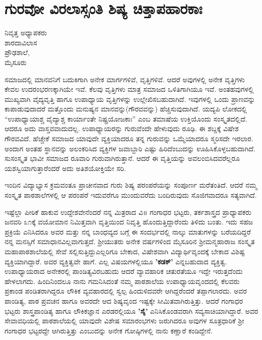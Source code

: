 \chapter{ಗುರವೋ ವಿರಲಾಸ್ಸಂತಿ  ಶಿಷ್ಯ ಚಿತ್ತಾಪಹಾರಕಾಃ}

\begin{center}
\smallskip

ನಿವೃತ್ತ ಅಧ್ಯಾಪಕರು\\
ಶಾರದಾವಿಲಾಸ\\ 
ಪ್ರೌಢಶಾಲೆ,\\ 
ಮೈಸೂರು
\addrule
\end{center}

ಸಮಾಜದಲ್ಲಿ ಮಾನವನಿಗೆ ಬದುಕಿಗಾಗಿ ಅನೇಕ ಮಾರ್ಗಗಳಿವೆ, ವೃತ್ತಿಗಳಿವೆ. ಆದರೆ ಅವುಗಳಲ್ಲಿ ಅನೇಕ ವೃತ್ತಿಗಳು ಕೇವಲ ಉದರಂಭರಣಕ್ಕಾಗಿಯೇ ಇವೆ. ಕೆಲವು ವೃತ್ತಿಗಳು ಮಾತ್ರ ಸಮಾಜದ ಒಳಿತಿಗಾಗಿಯೂ ಇವೆ. ಅಂತಹವುಗಳಲ್ಲಿ ಮುಖ್ಯವಾಗಿ ವೈದ್ಯವೃತ್ತಿ ಹಾಗೂ ಉಪಾಧ್ಯಾಯ ವೃತ್ತಿಗಳನ್ನು ಉಲ್ಲೇಖಿಸಬಹುದಾಗಿದೆ. ಇವುಗಳಲ್ಲಿ ಒಂದು ಪ್ರಾಣವನ್ನು ಕಾಪಾಡುವುದಾದರೆ ಮತ್ತೊಂದು ಮನುಷ್ಯನ ಮಾನವನ್ನು(ಗೌರವವನ್ನು) ಹೆಚ್ಚಿಸುವುದಾಗಿದೆ. ಯದ್ಯಪಿ ಲೋಕದಲ್ಲಿ “ಉಪಾಧ್ಯಾಯಾಶ್ಚ ವೈದ್ಯಾಶ್ಚ ಕಾರ್ಯಾಂತೇ ನಿಷ್ಪ್ರಯೋಜಕಾಃ” ಎಂಬ ತಮಾಷೆಯ ಉಕ್ತಿಯೊಂದು ಸಂಸ್ಕೃತದಲ್ಲಿದೆ. ಆದರೂ ಅದು ವಾಸ್ತವವಾದುದಲ್ಲ. ಉಪಾಧ್ಯಾಯರನ್ನು ಗುರುವೆಂದೇ ಹೇಳುವುದು ರೂಢಿ. ಈ ಶಬ್ದಕ್ಕೆ ವಿಷೇಶ ಗೌರವವಿದೆ. ಹೆಚ್ಚೇಕೆ ಸಮಾಜದ ಯಾವುದೇ ವ್ಯಕ್ತಿಯಾದರೂ ತನ್ನ ಗುರುವನ್ನು ಒಮ್ಮೆಯಾದರೂ ಸ್ಮರಿಸದೇ ಇರಲಾರ. ಅಂದಾಗ ಅಂತಹ ಸ್ಥಾನವನ್ನು ಅಲಂಕರಿಸಿದ ವ್ಯಕ್ತಿಗಳ ಜವಾಬ್ದಾರಿ ಎಷ್ಟು ಹಿರಿದೆಂಬುದನ್ನು ಊಹಿಸಿಕೊಳ್ಳಬಹುದಾಗಿದೆ. ಸುಸಂಸ್ಕೃತ ಭಾವೀ ಸಮಾಜದ ರೂವಾರಿ ಗುರುವಾಗಿರುತ್ತಾನೆ. ಆದರೆ ಈ ವೃತ್ತಿಯನ್ನು ಅವಲಂಬಿಸಿದವರೆಲ್ಲರೂ ಯಶಸ್ವಿಯಾಗುತ್ತಾರೆಂದರೆ ಅದು ಅತಿಶಯೋಕ್ತಿಯೇ ಸರಿ.

ಇಂದಿನ ವಿದ್ಯಾಭ್ಯಾಸ ಕ್ರಮವಂತೂ ಪ್ರಾಚೀನವಾದ ಗುರು ಶಿಷ್ಯ ಪರಂಪರೆಯನ್ನು ಸಂಪೂರ್ಣ ಮರೆತಂತಿದೆ. ಆದರೆ ನಮ್ಮ ಸಂಸ್ಕೃತ ಪಾಠಶಾಲೆಗಳಲ್ಲಿ ಆ ಪರಂಪರೆ ಇದುವರೆಗೂ ಮುಂದುವರೆದು ಬಂದಿರುವುದು ಸೊಜಿಗವಾದರೂ ಸತ್ಯವಾಗಿದೆ.

ಇಷ್ಟೆಲ್ಲಾ ಪೀಠಿಕೆ ಹಾಕುವ ಉದ್ದೇಶವೇನೆಂದರೆ ನನ್ನ ಮಿತ್ರರಾದ ವಿ॥ ಗಂಗಾಧರ ಭಟ್ಟರು, ತರ್ಕಶಾಸ್ತ್ರದ ಪ್ರಾಧ್ಯಾಪಕರು ಜನವರಿ ೩೧ಕ್ಕೆ ವಯೋಮಾನ ನಿಮಿತ್ತವಾಗಿ ವೃತ್ತಿಯಿಂದ ನಿವೃತ್ತಿ ಹೊಂದುತ್ತಿದ್ದಾರೆಂದು ತಿಳಿದು ಬಂತು. ಇದು ಸಹಜ ಪ್ರಕ್ರಿಯೆ ಎನಿಸಿದರೂ ಅವರ ಮತ್ತು ನನ್ನ ಬಾಂಧವ್ಯದ ಬಗ್ಗೆ ಈ ಸಂದರ್ಭದಲ್ಲಿ ನಾಲ್ಕು ಮಾತುಗಳನ್ನು ಬರೆಯದಿದ್ದರೆ ನನ್ನ ಮನಸ್ಸಿಗೆ ಸಮಾಧಾನವಿಲ್ಲವಾಗುತ್ತದೆ. ಶ್ರೀಯುತರು ಅನೇಕ ವರ್ಷಗಳಿಂದ ಮೈಸೂರಿನ ಶ್ರೀಮನ್ಮಹಾರಾಜ ಸಂಸ್ಕೃತ ಮಹಾಪಾಠಶಾಲೆಯಲ್ಲಿ ಸೇವೆ ಸಲ್ಲಿಸುತ್ತಿದ್ದುಎಲ್ಲರಿಗೂ ಬೇಕಾದ, ವಿಷೇಶವಾಗಿ ವಿದ್ಯಾರ್ಥಿವೃಂದಕ್ಕೆ ಬೇಕಾದ ವಿಶಿಷ್ಟ ವ್ಯಕ್ತಿಯಾಗಿದ್ದಾರೆ. ಅವರ ವ್ಯಕ್ತಿತ್ವವೇ ಹಾಗೆ. ಎಲ್ಲ ವಿಷಯಗಳಲ್ಲಿಯೂ \textbf{’ಕಡಕ್’} ಎನ್ನಬಹುದಾದ ವ್ಯಕ್ತಿತ್ವ. ಉಪಾಧ್ಯಾಯರಾದ ಅನೇಕರಲ್ಲಿ ಪಾಂಡಿತ್ಯವಿರಬಹುದು ಆದರೆ ವ್ಯಾವಹಾರಿಕ ಚತುರತೆಯೂ ಇದ್ದೇ ಇರುತ್ತದೆಂದು ಹೇಳಲಾಗದು. ಹಿಂದಿನಿಂದಲೂ ನಾನು ಗಮನಿಸಿದಂತೆ ನಮ್ಮ ಪಾಠಶಾಲೆಯ ಉಪಾಧ್ಯಾಯವೃಂದದಲ್ಲಿ ಕೆಲವರು ಪ್ರಕಾಂಡ ಪಂಡಿತರಾಗಿದ್ದರೂ ಲೌಕಿಕ ವ್ಯವಹಾರದಲ್ಲಿ ಸ್ವಲ್ಪ ಹಿಂದುಳಿದವರೇ ಆಗಿದ್ದರೆಂದರೆ ತಪ್ಪಾಗಲಾರದು. ಅವರ ಪಾಂಡಿತ್ಯ, ಪಾಠ ಪ್ರವಚನ ಹಾಗೂ ಅವರದೇ ಆದ ಶಿಷ್ಯವೃಂದ ಇಷ್ಟಕ್ಕೇ ಸೀಮಿತವಾಗಿರುತ್ತಿತ್ತು. ಆದರೆ ಗಂಗಾಧರ ಭಟ್ಟರು ಶಾಸ್ತ್ರಪಾಂಡಿತ್ಯ ಹಾಗೂ ಲೌಕಿಕಜ್ಞಾನ ಎರಡರಲ್ಲಿಯೂ \textbf{’ಸೈ’} ಎನಿಸಿಕೊಂಡವರಾಗಿ ಸವ್ಯಸಾಚಿಯಾಗಿದ್ದಾರೆ. ಅವರ ಸೇವಾವಧಿಯಲ್ಲಿ ಪಾಠಶಾಲೆಯಲ್ಲಿ ಯಾವುದೇ ವಿಶೇಷ ಸಮಾರಂಭಗಳು ಜರುಗಿದರೂ ಅವುಗಳ ಸೂತ್ರಧಾರಿಕೆ ಶ್ರೀ ಗಂಗಾಧರ ಭಟ್ಟರದ್ದೇ ಆಗಿರುತ್ತಿತ್ತು ಎಂಬುದನ್ನು ಅನೇಕ ಗೋಷ್ಠಿಗಳಲ್ಲಿ ನಾನು ಕಣ್ಣಾರೆ ಕಂಡಿದ್ದೇನೆ.

